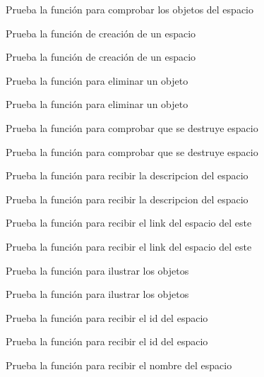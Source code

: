 \begin{DoxyRefList}
Prueba la función para comprobar los objetos del espacio  
\item[\label{test__test000026}%
\Hypertarget{test__test000026}%
Member \hyperlink{space__test_8c_a69278cc022dc5688d4725f8d36317b30}{test1\+\_\+space\+\_\+create} ()]Prueba la función de creación de un espacio 

Prueba la función de creación de un espacio  
\item[\label{test__test000065}%
\Hypertarget{test__test000065}%
Member \hyperlink{space__test_8c_abba8ffe9a4ad215d5c30483f0cf18581}{test1\+\_\+space\+\_\+delete\+\_\+object} ()]Prueba la función para eliminar un objeto 

Prueba la función para eliminar un objeto  
\item[\label{test__test000082}%
\Hypertarget{test__test000082}%
Member \hyperlink{space__test_8c_af3febdc46ce54799ebfcdbc4330ee93e}{test1\+\_\+space\+\_\+destroy} ()]Prueba la función para comprobar que se destruye espacio 

Prueba la función para comprobar que se destruye espacio  
\item[\label{test__test000060}%
\Hypertarget{test__test000060}%
Member \hyperlink{space__test_8c_a9a9da97ed6f49f2ae325177caecfea9c}{test1\+\_\+space\+\_\+get\+\_\+description} ()]Prueba la función para recibir la descripcion del espacio 

Prueba la función para recibir la descripcion del espacio  
\item[\label{test__test000051}%
\Hypertarget{test__test000051}%
Member \hyperlink{space__test_8c_a354adb2722b06ec65b7212d2736d6417}{test1\+\_\+space\+\_\+get\+\_\+east} ()]Prueba la función para recibir el link del espacio del este 

Prueba la función para recibir el link del espacio del este  
\item[\label{test__test000075}%
\Hypertarget{test__test000075}%
Member \hyperlink{space__test_8c_aa13123383321498e369984d6aacdb613}{test1\+\_\+space\+\_\+get\+\_\+gdesc\+\_\+illustration} ()]Prueba la función para ilustrar los objetos 

Prueba la función para ilustrar los objetos  
\item[\label{test__test000055}%
\Hypertarget{test__test000055}%
Member \hyperlink{space__test_8c_a920df9e02482f4f1e6a5ebcaec523860}{test1\+\_\+space\+\_\+get\+\_\+id} ()]Prueba la función para recibir el id del espacio 

Prueba la función para recibir el id del espacio  
\item[\label{test__test000043}%
\Hypertarget{test__test000043}%
Member \hyperlink{space__test_8c_ad12c42523c517507566c5c68b1527689}{test1\+\_\+space\+\_\+get\+\_\+name} ()]Prueba la función para recibir el nombre del espacio 


\end{DoxyRefList}

